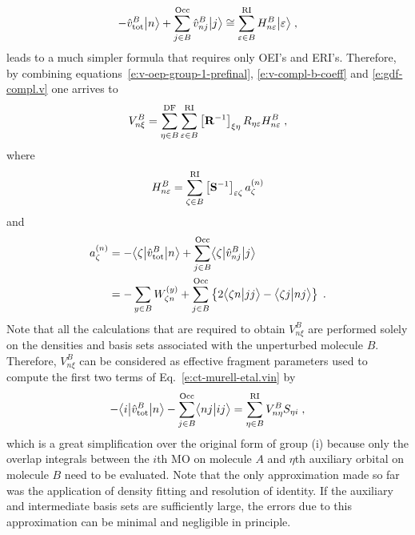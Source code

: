 \documentclass[aip,jcp,amsmath,amssymb,reprint,floatfix]{revtex4-1}
\begin{document}
%
\begin{equation}
-\hat{v}^B_{\rm tot} \Ket{n} + \sum_{j\in B}^{\rm Occ} \hat{v}^B_{nj} \Ket{j}
 \cong \sum_{\varepsilon\in B}^{\rm RI} H_{n\varepsilon}^B \Ket{\varepsilon} \;,
\end{equation}
%
leads to a much simpler formula
that requires only OEI's and ERI's.
Therefore, by combining
equations~\eqref{e:v-oep-group-1-prefinal}, \eqref{e:v-compl-b-coeff} and \eqref{e:gdf-compl.v}
one arrives to
%
\begin{equation} \label{e:v-oep-group-1-final}
 V^B_{n\xi} = \sum_{\eta\in B}^{\rm DF} 
          \sum_{\varepsilon\in B}^{\rm RI}
         \left[ {\bf R}^{-1} \right]_{\xi\eta}
         R_{\eta \varepsilon} 
         H_{n\varepsilon}^B \;,
\end{equation}
%
where
%
\begin{equation} \label{e:v-oep-group-1-final:H-matrix}
 H_{n\varepsilon}^B = \sum_{\zeta\in B}^{\rm RI} \left[ {\bf S}^{-1} \right]_{\varepsilon\zeta}
   a_\zeta^{(n)}
\end{equation}
%
and
\begin{align} \label{e:v-oep-group-1-final:a-vector}
 a^{(n)}_\zeta &= -\tBraKet{\zeta}{\hat{v}^B_{\rm tot}}{n}
      + \sum_{j\in B}^{\rm Occ} \tBraKet{\zeta}{\hat{v}^B_{nj}}{j} \nonumber \\
 &=-\sum_{y\in B} W^{(y)}_{\zeta n} 
  + \sum_{j\in B}^{\rm Occ} 
  \left\{
   2\BraKet{\zeta n}{jj} - \BraKet{\zeta j}{nj} 
  \right\} \;.
\end{align}
%
Note that all the calculations that are required to obtain $V^B_{n\xi}$ are performed
solely on the densities and basis sets associated with the unperturbed molecule $B$.
Therefore, $V^B_{n\xi}$ can be considered as effective fragment parameters
used to compute the first two terms of Eq.~\eqref{e:ct-murell-etal.vin} by
%
\begin{equation} \label{e:ct.group-i.final}
        -\tBraKet{i}{\hat{v}^B_{\rm tot} }{n} 
      - \sum_{j\in B}^{\rm Occ} \BraKet{nj}{ij} 
       = \sum_{\eta\in B}^{\rm RI} V^B_{n\eta} S_{\eta i} \;,
\end{equation}
%
which is a great simplification over the original form of group (i)
because only the overlap integrals between the $i$th MO on molecule $A$
and $\eta$th auxiliary orbital on molecule $B$ need to be evaluated. %
Note that the only approximation made so far was the application of density fitting
and resolution of identity. If the auxiliary and intermediate
basis sets are sufficiently large, the errors
due to this approximation can be minimal and negligible in principle.
\end{document}
